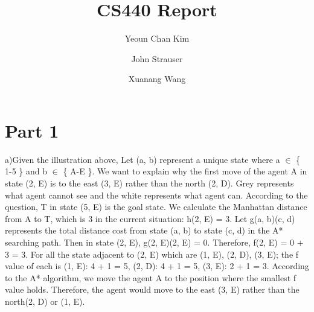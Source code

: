 \documentclass{article}
\author{Yeoun Chan Kim \and John Strauser \and Xuanang Wang}
\title{CS440 Report}
\begin{document}
\maketitle

\section*{Part 1}

\begingroup
\centering


\endgroup

\vspace{5mm} %

a)Given the illustration above, Let (a, b) represent a unique state where a $\in$ \{ 1-5 \} and b $\in$ \{ A-E \}. We want to explain why the first move of the agent A in state (2, E) is to the east (3, E) rather than the north (2, D). Grey represents what agent cannot see and the white represents what agent can. According to the question, T in state (5, E) is the goal state. We calculate the Manhattan distance from A to T, which is 3 in the current situation: h(2, E) = 3. Let g(a, b)(c, d) represents the total distance cost from state (a, b) to state (c, d) in the A* searching path. Then in state (2, E), g(2, E)(2, E) = 0. Therefore, f(2, E) = 0 + 3 = 3. For all the state adjacent to (2, E) which are (1, E), (2, D), (3, E); the f value of each is (1, E): 4 + 1 = 5, (2, D): 4 + 1 = 5, (3, E): 2 + 1 = 3. According to the A* algorithm, we move the agent A to the position where the smallest f value holds. Therefore, the agent would move to the east (3, E) rather than the north(2, D) or (1, E).
\hspace{5mm}
\end{document}
